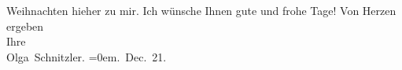 \begin{ledgroupsized}[t]{13cm}
               Weihnachten hieher zu mir.\pend
           \pstart
           {\pb}Ich wünsche Ihnen gute und frohe Tage! \pend
           \pstart
           Von Herzen ergeben{\\[\baselineskip]}Ihre{\\[\baselineskip]}\spacefill\mbox{Olga Schnitzler.}\pend
           \leftskip=0em{}. Dec. 21.\pend
                     \endnumbering{}\end{ledgroupsized}  \newcommand{\dateiname}{L02371}\newcommand{\titel}{Olga Schnitzler an Hermann Bahr, 16. 12. 1921}\newcommand{\editorInnen}{ Kurt Ifkovits,  Martin Anton Müller}
      